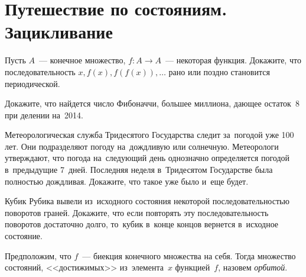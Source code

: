
\section*{Путешествие по состояниям. Зацикливание}


\begin{problems}

\item
Пусть $A$~--- конечное множество, $f \colon A \to A$~--- некоторая функция.
Докажите, что последовательность $x, f(x), f(f(x)), \ldots$ рано или поздно
становится периодической.

\item
Докажите, что найдется число Фибоначчи, большее миллиона, дающее остаток~8
при делении на~2014.

\item
Метеорологическая служба Тридесятого Государства следит за~погодой уже 100 лет.
Они подразделяют погоду на~дождливую или солнечную.
Метеорологи утверждают, что погода на~следующий день однозначно определяется
погодой в~предыдущие 7~дней.
Последняя неделя в~Тридесятом Государстве была полностью дождливая.
Докажите, что такое уже было и~еще будет.

\item
Кубик Рубика вывели из~исходного состояния некоторой последовательностью
поворотов граней.
Докажите, что если повторять эту последовательность поворотов достаточно долго,
то~кубик в~конце концов вернется в~исходное состояние.

\end{problems}

Предположим, что $f$~--- биекция конечного множества на себя.
Тогда множество состояний, <<достижимых>> из~элемента~$x$ функцией~$f$, назовем
\emph{орбитой}.

